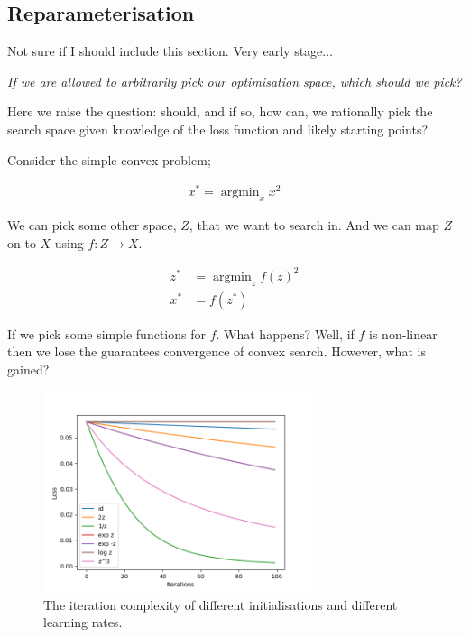 %

\newpage
\subsection{Reparameterisation}


{\color{red}Not sure if I should include this section. Very early stage...}

\begin{displayquote}
  \textsl{If we are allowed to arbitrarily pick our optimisation space, which should we pick?}
\end{displayquote}

Here we raise the question: should, and if so, how can, we rationally pick the
search space given knowledge of the loss function and likely starting points?

Consider the simple convex problem;

\begin{align*}
  x^{* } = \mathop{\text{argmin}}_{x} x^2
\end{align*}

We can pick some other space, $Z$, that we want to search in. And we can map $Z$ on to $X$ using $f: Z \to X$.

\begin{align*}
  z^{* } &=\mathop{\text{argmin}}_{z} f(z)^2 \\
    x^{* } &= f(z^{* })
\end{align*}

If we pick some simple functions for $f$. What happens? Well, if $f$ is non-linear
then we lose the guarantees convergence of convex search. However, what is gained?

\begin{figure}[h!]
\centering
\includegraphics[width=0.7\textwidth,height=0.35\textheight]{../../pictures/figures/reparam-ce-04.png}
\caption{The iteration complexity of different initialisations and different learning rates.}
\end{figure}

